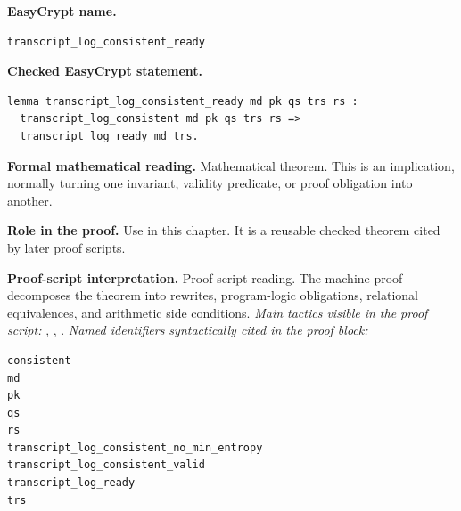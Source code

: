 \begin{formaltheorem}
\noindent\textbf{EasyCrypt name.}
\begin{lstlisting}[language=EasyCrypt,basicstyle=\ttfamily\scriptsize]
transcript_log_consistent_ready
\end{lstlisting}
\noindent\textbf{Checked EasyCrypt statement.}
\begin{lstlisting}[language=EasyCrypt,basicstyle=\ttfamily\scriptsize]
lemma transcript_log_consistent_ready md pk qs trs rs :
  transcript_log_consistent md pk qs trs rs =>
  transcript_log_ready md trs.
\end{lstlisting}
\noindent\textbf{Formal mathematical reading.}
Mathematical theorem. This is an implication, normally turning one invariant, validity predicate, or proof obligation into another.

\noindent\textbf{Role in the proof.}
Use in this chapter. It is a reusable checked theorem cited by later proof scripts.

\noindent\textbf{Proof-script interpretation.}
Proof-script reading. The machine proof decomposes the theorem into rewrites, program-logic obligations, relational equivalences, and arithmetic side conditions.
\emph{Main tactics visible in the proof script:} , , .
\emph{Named identifiers syntactically cited in the proof block:}
\begin{lstlisting}[language=EasyCrypt,basicstyle=\ttfamily\scriptsize]
consistent
md
pk
qs
rs
transcript_log_consistent_no_min_entropy
transcript_log_consistent_valid
transcript_log_ready
trs
\end{lstlisting}

\end{formaltheorem}

